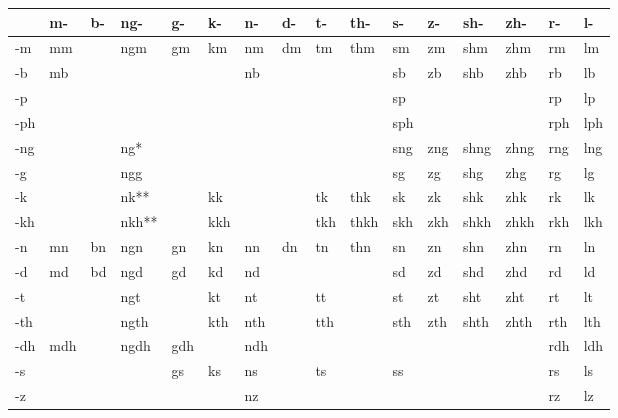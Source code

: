 \begin{table}[H]
\begin{tabular}{ l|l|l|l|l|l|l|l|l|l|l|l|l|l|l|l }
	    & m-   & b-   & ng-  & g-   & k-   & n-   & d-   & t-   & th-  & s-   & z-   & sh-  & zh-  & r-   & l-   \\
	\hline
	-m  & mm   &      & ngm  & gm   & km   & nm   & dm   & tm   & thm  & sm   & zm   & shm  & zhm  & rm   & lm   \\
	-b  & mb   &      &      &      &      & nb   &      &      &      & sb   & zb   & shb  & zhb  & rb   & lb   \\
	-p  &      &      &      &      &      &      &      &      &      & sp   &      &      &      & rp   & lp   \\
	-ph &      &      &      &      &      &      &      &      &      & sph  &      &      &      & rph  & lph  \\
	-ng &      &      & ng*  &      &      &      &      &      &      & sng  & zng  & shng & zhng & rng  & lng  \\
	-g  &      &      & ngg  &      &      &      &      &      &      & sg   & zg   & shg  & zhg  & rg   & lg   \\
	-k  &      &      & nk** &      & kk   &      &      & tk   & thk  & sk   & zk   & shk  & zhk  & rk   & lk   \\
	-kh &      &      & nkh**&      & kkh  &      &      & tkh  & thkh & skh  & zkh  & shkh & zhkh & rkh  & lkh  \\
	-n  & mn   & bn   & ngn  & gn   & kn   & nn   & dn   & tn   & thn  & sn   & zn   & shn  & zhn  & rn   & ln   \\
	-d  & md   & bd   & ngd  & gd   & kd   & nd   &      &      &      & sd   & zd   & shd  & zhd  & rd   & ld   \\
	-t  &      &      & ngt  &      & kt   & nt   &      & tt   &      & st   & zt   & sht  & zht  & rt   & lt   \\
	-th &      &      & ngth &      & kth  & nth  &      & tth  &      & sth  & zth  & shth & zhth & rth  & lth  \\
	-dh & mdh  &      & ngdh & gdh  &      & ndh  &      &      &      &      &      &      &      & rdh  & ldh  \\
	-s  &      &      &      & gs   & ks   & ns   &      & ts   &      & ss   &      &      &      & rs   & ls   \\
	-z  &      &      &      &      &      & nz   &      &      &      &      &      &      &      & rz   & lz   \\

\end{tabular}
\end{table}
